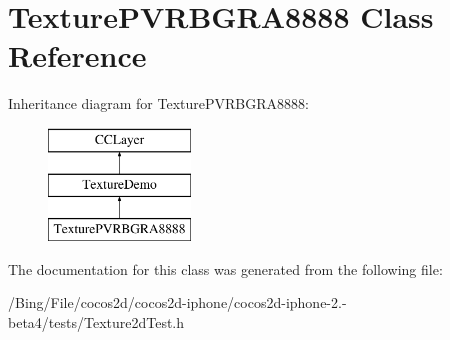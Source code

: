 \hypertarget{interface_texture_p_v_r_b_g_r_a8888}{\section{Texture\-P\-V\-R\-B\-G\-R\-A8888 Class Reference}
\label{interface_texture_p_v_r_b_g_r_a8888}
}
Inheritance diagram for Texture\-P\-V\-R\-B\-G\-R\-A8888\-:\begin{figure}[H]
\begin{center}
\leavevmode
\includegraphics[height=3.000000cm]{interface_texture_p_v_r_b_g_r_a8888}
\end{center}
\end{figure}


The documentation for this class was generated from the following file\-:\begin{DoxyCompactItemize}
\item 
/\-Bing/\-File/cocos2d/cocos2d-\/iphone/cocos2d-\/iphone-\/2.-\/beta4/tests/Texture2d\-Test.\-h\end{DoxyCompactItemize}
